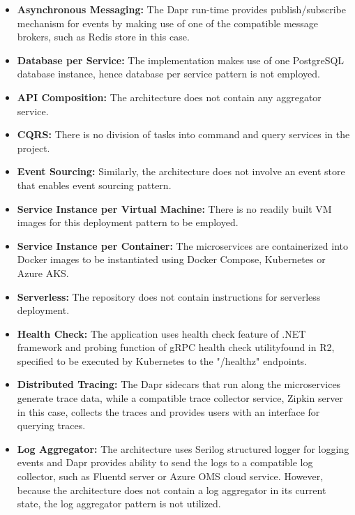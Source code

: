 \documentclass{Configuration_Files/PoliMi3i_thesis}
\begin{document}
\begin{itemize}
    \item \textbf{Asynchronous Messaging:} The Dapr run-time provides publish/subscribe mechanism for events by making use of one of the compatible message brokers, such as Redis store in this case.
    
    \item \textbf{Database per Service:} The implementation makes use of one PostgreSQL database instance, hence database per service pattern is not employed.
    
    \item \textbf{API Composition:} The architecture does not contain any aggregator service.
    
    \item \textbf{CQRS:} There is no division of tasks into command and query services in the project.
    
    \item \textbf{Event Sourcing:} Similarly, the architecture does not involve an event store that enables event sourcing pattern.
    
    \item \textbf{Service Instance per Virtual Machine:} There is no readily built VM images for this deployment pattern to be employed.
    
    \item \textbf{Service Instance per Container:} The microservices are containerized into Docker images to be instantiated using Docker Compose, Kubernetes or Azure AKS.
    
    \item \textbf{Serverless:} The repository does not contain instructions for serverless deployment.
    
    \item \textbf{Health Check:} The application uses health check feature of .NET framework and probing function of gRPC health check utility\footnotemark[73] found in R2, specified to be executed by Kubernetes to the "/healthz" endpoints.
    
    \item \textbf{Distributed Tracing:} The Dapr sidecars that run along the microservices generate trace data, while a compatible trace collector service, Zipkin server in this case, collects the traces and provides users with an interface for querying traces.
    
    \item \textbf{Log Aggregator:} The architecture uses Serilog structured logger for logging events and Dapr provides ability to send the logs to a compatible log collector, such as Fluentd server or Azure OMS cloud service.
    However, because the architecture does not contain a log aggregator in its current state, the log aggregator pattern is not utilized.
    

\end{itemize}
\end{document}
